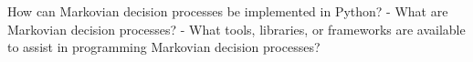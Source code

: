 How can Markovian decision processes be implemented in Python?
- What are Markovian decision processes?
- What tools, libraries, or frameworks are available to assist in programming Markovian decision processes?
